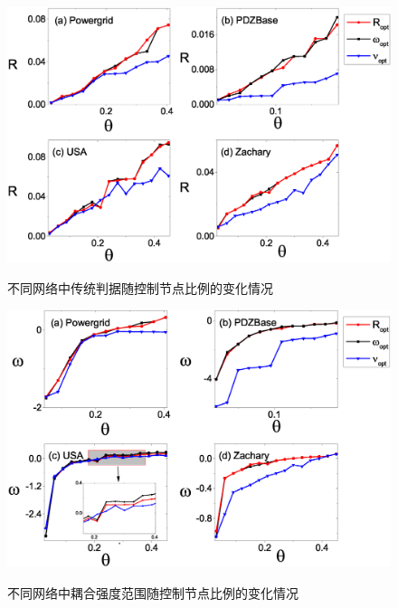 \begin{figure}[htbp]%
	\centering
	\includegraphics[width=0.9\columnwidth]{chapter3Fig/R.eps}\\
	\caption{不同网络中传统判据随控制节点比例的变化情况}
	\label{Fig: opt_r}	
	
\end{figure}

\begin{figure}[hp]%
	\centering
	\includegraphics[width=0.9\columnwidth]{chapter3Fig/W.eps}\\
	\caption{不同网络中耦合强度范围随控制节点比例的变化情况}
	\label{Fig: opt_W}	
	
\end{figure}

